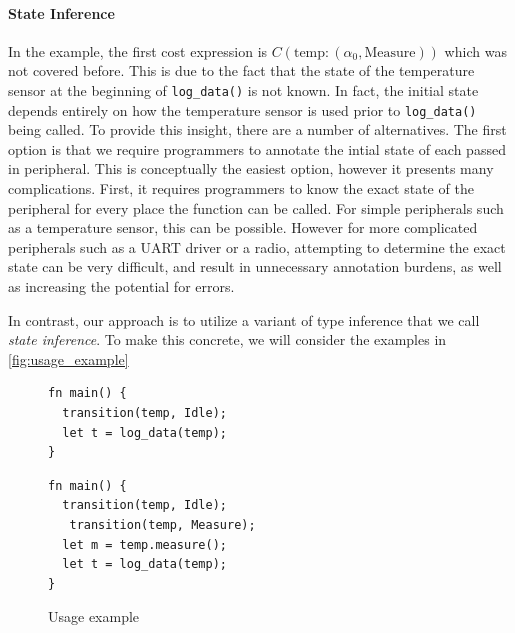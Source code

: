 \paragraph{State Inference}
In the example, the first cost expression is $C(\text{temp}:(\alpha_0,\text{Measure}))$ which was not covered before. This is due to the fact that the state of the temperature sensor at the beginning of \texttt{log\_data()} is not known. In fact, the initial state depends entirely on how the temperature sensor is used prior to \texttt{log\_data()} being called. To provide this insight, there are a number of alternatives. The first option is that we require programmers to annotate the intial state of each passed in peripheral. This is conceptually the easiest option, however it presents many complications. First, it requires programmers to know the exact state of the peripheral for every place the function can be called. For simple peripherals such as a temperature sensor, this can be possible. However for more complicated peripherals such as a UART driver or a radio, attempting to determine the exact state can be very difficult, and result in unnecessary annotation burdens, as well as increasing the potential for errors. 

In contrast, our approach is to utilize a variant of type inference that we call \textit{state inference}. To make this concrete, we will consider the examples in \autoref{fig:usage_example}

\begin{figure}[h]
\small
    \begin{minipage}{0.45\linewidth}
\begin{verbatim}
fn main() {
  transition(temp, Idle);
  let t = log_data(temp);
}
\end{verbatim}
    \end{minipage}
\begin{minipage}{0.45\linewidth}
\begin{verbatim}
fn main() {
  transition(temp, Idle);
   transition(temp, Measure);
  let m = temp.measure();
  let t = log_data(temp);
}
\end{verbatim}
\end{minipage}
\vspace{-6pt}
    \caption{Usage example}
\label{fig:usage_example}
\end{figure}

